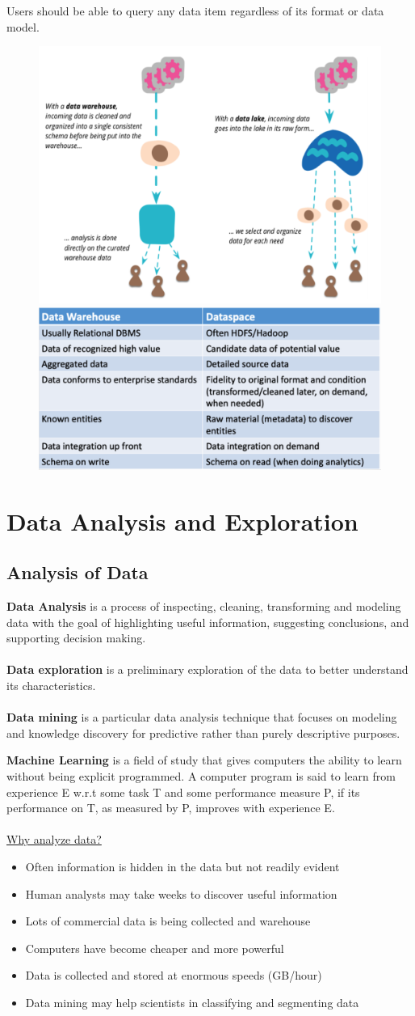 \documentclass[10pt,a4paper]{article}
\newcommand{\nline}{\\~\\}
\begin{document}
Users should be able to query any data item regardless of its format or data model.
\begin{figure}[htp]
\centering
\includegraphics[width=.5\textwidth]{images/data-spaces}\hfill
\includegraphics[width=.5\textwidth]{images/data-spaces-vs-dw}\hfill
\end{figure}

\section{Data Analysis and Exploration}
\subsection{Analysis of Data}
\textbf{Data Analysis} is a process of inspecting, cleaning, transforming and modeling data with the goal of highlighting useful information, suggesting conclusions, and supporting decision making.
\nline
\textbf{Data exploration} is a preliminary exploration of the data to better understand its characteristics.
\nline
\textbf{Data mining} is a particular data analysis technique that focuses on modeling and knowledge discovery for predictive rather than purely descriptive purposes.

\textbf{Machine Learning} is a field of study that gives computers the ability to learn without being explicit programmed. A computer program is said to learn from experience E w.r.t some task T and some performance measure P, if its performance on T, as measured by P, improves with experience E.
\nline
\uline{Why analyze data?}
\begin{itemize}
	\item Often information is hidden in the data but not readily evident
	\item Human analysts may take weeks to discover useful information
	\item Lots of commercial data is being collected and warehouse
	\item Computers have become cheaper and more powerful
	\item Data is collected and stored at enormous speeds (GB/hour)
	\item Data mining may help scientists in classifying and segmenting data
\end{itemize}
\end{document}
